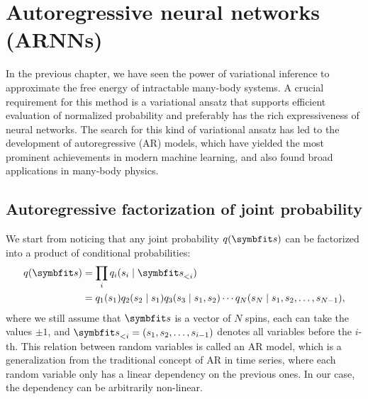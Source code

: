\chapter{Autoregressive neural networks (ARNNs)}
\label{ch:arnn}

In the previous chapter, we have seen the power of variational inference to approximate the free energy of intractable many-body systems. A crucial requirement for this method is a variational ansatz that supports efficient evaluation of normalized probability and preferably has the rich expressiveness of neural networks. The search for this kind of variational ansatz has led to the development of autoregressive (AR) models, which have yielded the most prominent achievements in modern machine learning, and also found broad applications in many-body physics.

\section{Autoregressive factorization of joint probability}

We start from noticing that any joint probability $q(\vs)$ can be factorized into a product of conditional probabilities:
\begin{align}
q(\vs) &= \prod_i q_i(s_i \mid \vs_{< i}) \label{eq:autoreg} \\
&= q_1(s_1) q_2(s_2 \mid s_1) q_3(s_3 \mid s_1, s_2) \cdots q_N(s_N \mid s_1, s_2, \ldots, s_{N - 1}),
\end{align}
where we still assume that $\vs$ is a vector of $N$ spins, each can take the values $\pm 1$, and $\vs_{< i} = (s_1, s_2, \ldots, s_{i - 1})$ denotes all variables before the $i$-th. This relation between random variables is called an AR model, which is a generalization from the traditional concept of AR in time series, where each random variable only has a linear dependency on the previous ones. In our case, the dependency can be arbitrarily non-linear.

